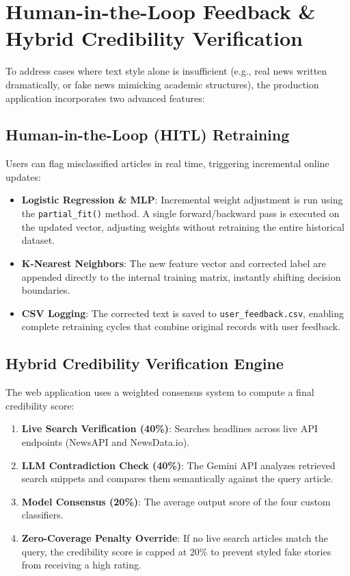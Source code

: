 \documentclass[conference]{IEEEtran}
\begin{document}
\section{Human-in-the-Loop Feedback \& Hybrid Credibility Verification}
To address cases where text style alone is insufficient (e.g., real news written dramatically, or fake news mimicking academic structures), the production application incorporates two advanced features:

\subsection{Human-in-the-Loop (HITL) Retraining}
Users can flag misclassified articles in real time, triggering incremental online updates:
\begin{itemize}
\item \textbf{Logistic Regression \& MLP}: Incremental weight adjustment is run using the \texttt{partial\_fit()} method. A single forward/backward pass is executed on the updated vector, adjusting weights without retraining the entire historical dataset.
\item \textbf{K-Nearest Neighbors}: The new feature vector and corrected label are appended directly to the internal training matrix, instantly shifting decision boundaries.
\item \textbf{CSV Logging}: The corrected text is saved to \texttt{user\_feedback.csv}, enabling complete retraining cycles that combine original records with user feedback.
\end{itemize}

\subsection{Hybrid Credibility Verification Engine}
The web application uses a weighted consensus system to compute a final credibility score:
\begin{enumerate}
\item \textbf{Live Search Verification (40\%)}: Searches headlines across live API endpoints (NewsAPI and NewsData.io).
\item \textbf{LLM Contradiction Check (40\%)}: The Gemini API analyzes retrieved search snippets and compares them semantically against the query article.
\item \textbf{Model Consensus (20\%)}: The average output score of the four custom classifiers.
\item \textbf{Zero-Coverage Penalty Override}: If no live search articles match the query, the credibility score is capped at 20\% to prevent styled fake stories from receiving a high rating.
\end{enumerate}
\end{document}
